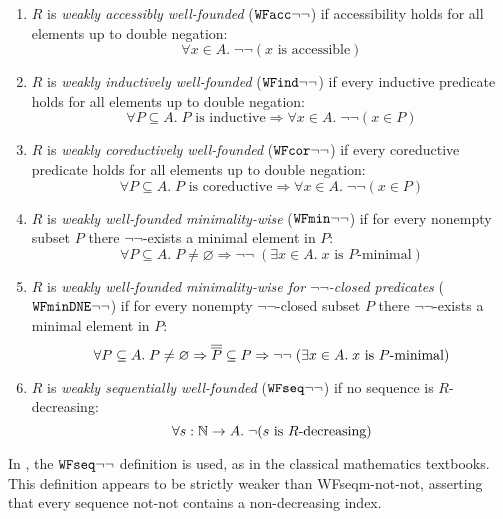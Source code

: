\begin{definition} \label{def:WFweakproperties} \hfill
  \begin{enumerate}
    \item $R$ is \emph{weakly accessibly well-founded} ($\mathtt{WFacc}{\lnot\lnot}$) if accessibility holds for all elements up to double negation:
      \[
        \forall x \in A.\; \lnot \lnot  (x \text{ is accessible})
      \]
    \item $R$ is \emph{weakly inductively well-founded} ($\mathtt{WFind}{\lnot\lnot}$) if every inductive predicate holds for all elements up to double negation:
      \[
        \forall P \subseteq A.\;\text{$P$ is inductive} \Rightarrow \forall x \in A.\; \lnot \lnot (x \in P)
      \]
    \item $R$ is \emph{weakly coreductively well-founded} ($\mathtt{WFcor}{\lnot\lnot}$) if every coreductive predicate holds for all elements up to double negation:
      \[
        \forall P \subseteq A.\;\text{$P$ is coreductive} \Rightarrow \forall x \in A.\; \lnot\lnot(x \in P)
      \]
    \item  $R$ is \emph{weakly well-founded minimality-wise} ($\mathtt{WFmin}{\lnot\lnot}$)
      if for every nonempty subset $P$ there $\lnot \lnot$-exists a minimal element in $P$:
      \[
        \forall P \subseteq A.\; P \neq \varnothing \Rightarrow \lnot \lnot \;
        (\exists x \in A.\; \text{$x$ is $P$-minimal})
      \]
    \item  $R$ is \emph{weakly well-founded minimality-wise for $\lnot \lnot$-closed predicates} ($\mathtt{WFminDNE}{\lnot\lnot}$)
      if for every nonempty $\lnot \lnot$-closed subset $P$ there $\lnot \lnot$-exists a minimal element in $P$:
      \[
        \forall P \subseteq A.\; P \neq \varnothing \Rightarrow \overline{\overline{P}} \subseteq P\Rightarrow \lnot \lnot \;
        (\exists x \in A.\; \text{$x$ is $P$-minimal})
      \]
  \item $R$ is \emph{weakly sequentially well-founded} ($\mathtt{WFseq}{\lnot\lnot}$) if no sequence is $R$-decreasing:
    \[
      \forall s:\mathbb{N} \to A.\; \lnot \text{($s$ is $R$-decreasing)}
    \]
\end{enumerate}
\end{definition}

In \cite{Terese}, the $\mathtt{WFseq}{\lnot\lnot}$ definition is used, as in the classical mathematics textbooks.  This definition appears to be strictly weaker than
WFseqm-not-not, asserting that every sequence not-not contains a
non-decreasing index.

